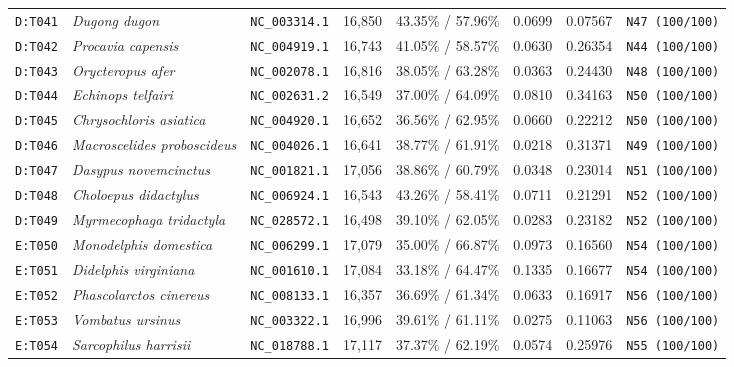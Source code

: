 \documentclass[10pt,letterpaper]{article}
\begin{document}
\begin{longtable}{llllllll}
\texttt{D:T041} & \textit{Dugong dugon} & \texttt{NC\_003314.1} & 16,850 & 43.35\% / 57.96\% & 0.0699 & 0.07567 & \texttt{N47 (100/100)} \\
\texttt{D:T042} & \textit{Procavia capensis} & \texttt{NC\_004919.1} & 16,743 & 41.05\% / 58.57\% & 0.0630 & 0.26354 & \texttt{N44 (100/100)} \\
\texttt{D:T043} & \textit{Orycteropus afer} & \texttt{NC\_002078.1} & 16,816 & 38.05\% / 63.28\% & 0.0363 & 0.24430 & \texttt{N48 (100/100)} \\
\texttt{D:T044} & \textit{Echinops telfairi} & \texttt{NC\_002631.2} & 16,549 & 37.00\% / 64.09\% & 0.0810 & 0.34163 & \texttt{N50 (100/100)} \\
\texttt{D:T045} & \textit{Chrysochloris asiatica} & \texttt{NC\_004920.1} & 16,652 & 36.56\% / 62.95\% & 0.0660 & 0.22212 & \texttt{N50 (100/100)} \\
\texttt{D:T046} & \textit{Macroscelides proboscideus} & \texttt{NC\_004026.1} & 16,641 & 38.77\% / 61.91\% & 0.0218 & 0.31371 & \texttt{N49 (100/100)} \\
\texttt{D:T047} & \textit{Dasypus novemcinctus} & \texttt{NC\_001821.1} & 17,056 & 38.86\% / 60.79\% & 0.0348 & 0.23014 & \texttt{N51 (100/100)} \\
\texttt{D:T048} & \textit{Choloepus didactylus} & \texttt{NC\_006924.1} & 16,543 & 43.26\% / 58.41\% & 0.0711 & 0.21291 & \texttt{N52 (100/100)} \\
\texttt{D:T049} & \textit{Myrmecophaga tridactyla} & \texttt{NC\_028572.1} & 16,498 & 39.10\% / 62.05\% & 0.0283 & 0.23182 & \texttt{N52 (100/100)} \\
\texttt{E:T050} & \textit{Monodelphis domestica} & \texttt{NC\_006299.1} & 17,079 & 35.00\% / 66.87\% & 0.0973 & 0.16560 & \texttt{N54 (100/100)} \\
\texttt{E:T051} & \textit{Didelphis virginiana} & \texttt{NC\_001610.1} & 17,084 & 33.18\% / 64.47\% & 0.1335 & 0.16677 & \texttt{N54 (100/100)} \\
\texttt{E:T052} & \textit{Phascolarctos cinereus} & \texttt{NC\_008133.1} & 16,357 & 36.69\% / 61.34\% & 0.0633 & 0.16917 & \texttt{N56 (100/100)} \\
\texttt{E:T053} & \textit{Vombatus ursinus} & \texttt{NC\_003322.1} & 16,996 & 39.61\% / 61.11\% & 0.0275 & 0.11063 & \texttt{N56 (100/100)} \\
\texttt{E:T054} & \textit{Sarcophilus harrisii} & \texttt{NC\_018788.1} & 17,117 & 37.37\% / 62.19\% & 0.0574 & 0.25976 & \texttt{N55 (100/100)} \\

\end{longtable}
\end{document}
